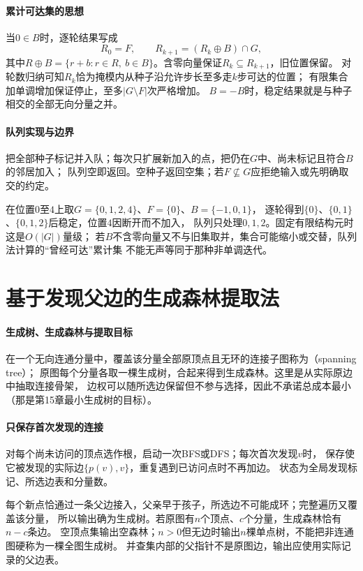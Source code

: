 \paragraph{累计可达集的思想}
当$0\in B$时，逐轮结果写成
\begin{equation}
  R_0=F,\qquad R_{k+1}=(R_k\oplus B)\cap G,
  \label{eq:graph-mask-reconstruction}
\end{equation}
其中$R\oplus B=\{r+b:r\in R,\ b\in B\}$。含零向量保证$R_k\subseteq R_{k+1}$，旧位置保留。
对轮数归纳可知$R_k$恰为掩模内从种子沿允许步长至多走$k$步可达的位置；
有限集合加单调增加保证停止，至多$|G\setminus F|$次严格增加。
$B=-B$时，稳定结果就是与种子相交的全部无向分量之并。

\paragraph{队列实现与边界}
\begin{algorithm}[种子队列掩模重建]
  把全部种子标记并入队；每次只扩展新加入的点，把仍在$G$中、尚未标记且符合$B$的邻居加入；
  队列空即返回。空种子返回空集；若$F\not\subseteq G$应拒绝输入或先明确取交的约定。
\end{algorithm}
在位置$0$至$4$上取$G=\{0,1,2,4\}$、$F=\{0\}$、$B=\{-1,0,1\}$，
逐轮得到$\{0\}$、$\{0,1\}$、$\{0,1,2\}$后稳定，位置$4$因断开而不加入，
队列只处理$0,1,2$。固定有限结构元时这是$O(|G|)$量级；
若$B$不含零向量又不与旧集取并，集合可能缩小或交替，队列法计算的“曾经可达”累计集
不能无声等同于那种非单调迭代。

\section{基于发现父边的生成森林提取法}
\label{sec:graph-theory-spanning-skeleton}

\paragraph{生成树、生成森林与提取目标}
在一个无向连通分量中，覆盖该分量全部原顶点且无环的连接子图称为（spanning tree）；
原图每个分量各取一棵生成树，合起来得到生成森林。这里是从实际原边中抽取连接骨架，
边权可以随所选边保留但不参与选择，因此不承诺总成本最小（那是第15章最小生成树的目标）。

\paragraph{只保存首次发现的连接}
\begin{algorithm}[发现父边抽取生成森林]
  对每个尚未访问的顶点选作根，启动一次BFS或DFS；每次首次发现$v$时，
  保存使它被发现的实际边$\{p(v),v\}$，重复遇到已访问点时不再加边。
  状态为全局发现标记、所选边表和分量数。
\end{algorithm}
每个新点恰通过一条父边接入，父亲早于孩子，所选边不可能成环；完整遍历又覆盖该分量，
所以输出确为生成树。若原图有$n$个顶点、$c$个分量，生成森林恰有$n-c$条边。
空顶点集输出空森林；$n>0$但无边时输出$n$棵单点树，不能把非连通图硬称为一棵全图生成树。
并查集内部的父指针不是原图边，输出应使用实际记录的父边表。

